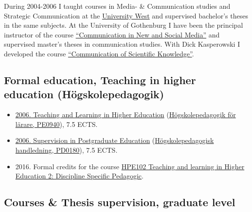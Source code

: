 \documentclass[a4paper,11pt,oneside]{article}
\begin{document}
  During 2004-2006 I taught courses in Media- \& Communication studies and Strategic Communication
  at the \href{http://files.christopherkullenberg.se/universitywest.pdf}{University West} and supervised bachelor's theses in the same subjects.
  At the University of Gothenburg I have been the principal instructor of the course
  \href{http://files.christopherkullenberg.se/kursplaner/KT2102.pdf}{``Communication in New and Social Media''} and supervised master's theses in communication studies.
  With Dick Kasperowski I developed the course \href{http://files.christopherkullenberg.se/kursplaner/KT2110.pdf}{``Communication of Scientific Knowledge''}.\\



    \subsection{Formal education, Teaching in higher education (Högskolepedagogik)}
    \begin{itemize}
      \item \href{http://files.christopherkullenberg.se/hogskolepedagogikonline.pdf}{2006. Teaching and Learning in Higher Education} (\href{http://files.christopherkullenberg.se/PE0940.pdf}{Högskolepedagogik för lärare, PE0940}), 7.5 ECTS.
      \item \href{http://files.christopherkullenberg.se/hogskolepedagogikonline.pdf}{2006. Supervision in Postgraduate Education} (\href{http://files.christopherkullenberg.se/PD0180.pdf}{Högskolepedagogisk handledning, PD0180}), 7.5 ECTS.
      \item 2016. Formal credits for the course \href{http://kursplaner.gu.se/svenska/HPE102.pdf}{HPE102 Teaching and learning in Higher Education 2: Discipline Specific Pedagogic}.
    \end{itemize}


    \subsection{Courses \& Thesis supervision, graduate level}
\end{document}
